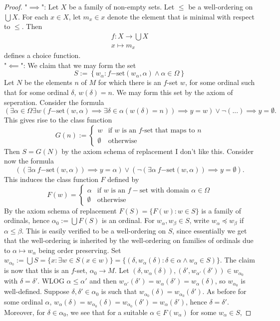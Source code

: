 \begin{proof}
    "$\implies$": Let $X$ be a family of non-empty sets. Let $\leq$ be a well-ordering on $\bigcup X$. For each $x\in X$, let $m_x\in x$ denote the element that is minimal with respect to $\leq$. Then 
    \begin{gather*}
        f : X \rightarrow \bigcup X\\
        x \mapsto m_x
    \end{gather*}
    defines a choice function.\\
    "$\impliedby$": 
    We claim that we may form the set 
    $$S:= \left\{w_\alpha : f\mathrm{-set}(w_\alpha,\alpha)\wedge\alpha \in \Omega\right\}$$
    Let $N$ be the elements $n$ of $M$ for which there is an $f$-set $w$, for some ordinal such that for some ordinal $\delta$, $w(\delta)=n$. We may form this set by the axiom of seperation. Consider the formula
    $$(\exists \alpha\in \Omega\exists w(f\mathrm{-set}(w,\alpha)\implies \exists \delta\in \alpha (w(\delta)=n))\implies y=w) \vee \neg(...)\implies y=\emptyset. $$
    This gives rise to the class function 
    $$G(n) := \begin{cases}
        w & \text{if } w \text{ is an } f \text{-set that maps to } n\\
        \emptyset &\text{otherwise} 
    \end{cases}$$
    Then $S=G(N)$ by the axiom schema of replacement {\Large I don't like this}.
    Consider now the formula
    $$((\exists \alpha\ f\mathrm{-set}(w,\alpha)) \implies y = \alpha)\vee (\neg(\exists \alpha \ f\mathrm{-set}(w,\alpha)) \implies y = \emptyset).$$
    This induces the class function $F$ defined by
    $$F(w) = \begin{cases}
        \alpha & \text{if } w \text{ is an } f-\text{set with domain } \alpha\in \Omega\\
        \emptyset & \text{otherwise} 
    \end{cases}$$
    By the axiom schema of replacement $F(S)=\{F(w) : w\in S\}$ is a family of ordinals, hence $\alpha_0:=\bigcup F(S)$ is an ordinal. For $w_\alpha,w_\beta \in S$, write $w_\alpha \preceq w_\beta$ if $\alpha \leq \beta$. This is easily verified to be a well-ordering on $S$, since essentially we get that the well-ordering is inherited by the well-ordering on families of ordinals due to $\alpha\mapsto w_\alpha$ being order preserving. Set $w_{\alpha_0} := \bigcup S= \{x: \exists w\in S(x\in w)\}=\{(\delta,w_\alpha(\delta): \delta\in\alpha\wedge w_\alpha\in S)\}$. The claim is now that this is an $f$-set, $\alpha_0\rightarrow M$. Let $(\delta,w_{\alpha}(\delta)),(\delta',w_{\alpha'}(\delta'))\in w_{\alpha_0}$ with $\delta=\delta'$. WLOG $\alpha \leq \alpha'$ and then $w_{\alpha'}(\delta')=w_{\alpha}(\delta')=w_{\alpha}(\delta)$, so $w_{\alpha_0}$ is well-defined. Suppose $\delta,\delta'\in \alpha_0$ is such that $w_{\alpha_0}(\delta)=w_{\alpha_0}(\delta')$. As before for some ordinal $\alpha$, $w_\alpha(\delta)=w_{\alpha_0}(\delta)=w_{\alpha_0}(\delta')=w_\alpha(\delta')$, hence $\delta=\delta'$. Moreover, for $\delta\in \alpha_0$, we see that for a suitable $\alpha\in F(w_\alpha)$ for some $w_\alpha\in S$, 

\end{proof}
